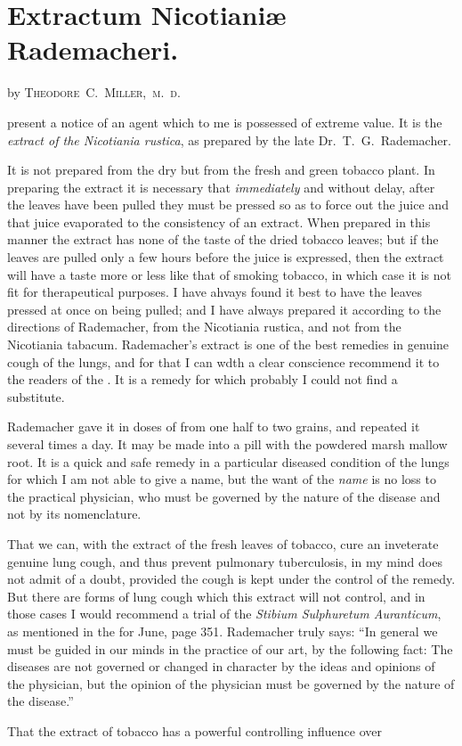 \section*{Extractum Nicotianiæ Rademacheri.}

by \textsc{Theodore~C.~Miller,\ m.~d.}

 present a notice of an agent which to me is possessed of
extreme value. It is the \emph{extract of the Nicotiania rustica}, as prepared
by the late Dr.~T.~G.\ Rademacher.

It is not prepared from the dry but from the fresh and green tobacco
plant. In preparing the extract it is necessary that \emph{immediately} and
without delay, after the leaves have been pulled they must be pressed
so as to force out the juice and that juice evaporated to the consistency
of an extract. When prepared in this manner the extract has none of
the taste of the dried tobacco leaves; but if the leaves are pulled only
a few hours before the juice is expressed, then the extract will have a
taste more or less like that of smoking tobacco, in which case it is not
fit for therapeutical purposes. I have ahvays found it best to have the
leaves pressed at once on being pulled; and I have always prepared it
according to the directions of Rademacher, from the Nicotiania rustica,
and not from the Nicotiania tabacum. Rademacher's extract is one of
the best remedies in genuine cough of the lungs, and for that I can wdth
a clear conscience recommend it to the readers of the .
It is a remedy for which probably I could not find a substitute.

Rademacher gave it in doses of from one half to two grains, and repeated
it several times a day. It may be made into a pill with the
powdered marsh mallow root. It is a quick and safe remedy in a particular
diseased condition of the lungs for which I am not able to give
a name, but the want of the \emph{name} is no loss to the practical physician,
who must be governed by the nature of the disease and not by its
nomenclature.

That we can, with the extract of the fresh leaves of tobacco, cure an
inveterate genuine lung cough, and thus prevent pulmonary tuberculosis,
in my mind does not admit of a doubt, provided the cough is kept under
the control of the remedy. But there are forms of lung cough which
this extract will not control, and in those cases I would recommend a
trial of the \emph{Stibium Sulphuretum Auranticum}, as mentioned in the
 for June, page 351. Rademacher truly says: ``In
general we must be guided in our minds in the practice of our art, by
the following fact: The diseases are not governed or changed in character
by the ideas and opinions of the physician, but the opinion of
the physician must be governed by the nature of the disease.''

That the extract of tobacco has a powerful controlling influence over\endinput
